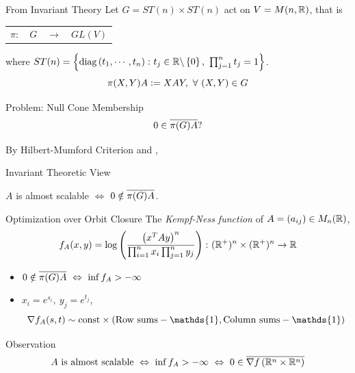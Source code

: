 \documentclass{beamer}
\begin{document}
	\begin{frame}{From Invariant Theory}
		Let $G = ST(n) \times ST(n)$ act on $V = M(n,\mathbb{R})$, that is
		\vspace{-0.5em}
		\begin{center}
			\begin{tabular}{rrcl}
				$\pi \colon$ & $G$ & $\longrightarrow$ & $GL(V)$
			\end{tabular}
		\end{center}
		\vspace{-0.5em}
		where $ST(n) = \left\{\operatorname{diag}\left(t_1,\cdots,t_n\right) \colon t_j \in \mathbb{R} \backslash \left\{0\right\},~\prod_{j=1}^n t_j = 1\right\}$. 
		\begin{equation*}
			\pi(X,Y)A \defeq XAY,~\forall~(X,Y) \in G
			\vspace{-1.5em}
		\end{equation*}
		\begin{block}{Problem: Null Cone Membership}
			\begin{equation*}
				0 \in \clo{\pi(G)A}?
				\vspace{0.5em}
			\end{equation*}
		\end{block}
		\vspace{0.5em}
		By Hilbert-Mumford Criterion \cite{key2,key3} and \cite{key1},
		\begin{block}{Invariant Theoretic View}
			\begin{center}
				$A$ is almost scalable $\Leftrightarrow$ $0 \notin \overline{\pi(G)A}$.
			\end{center}
		\end{block}
	\end{frame}

	\begin{frame}{Optimization over Orbit Closure}
		The \emph{Kempf-Ness function} of $A = (a_{ij}) \in M_n(\mathbb{R})$,
		\begin{equation*}
			f_A(x,y) = \log \left(\frac{\left(x^TAy\right)^n}{\prod_{i=1}^nx_i \prod_{j=1}^ny_j}\right) \colon (\mathbb{R}^+)^{n} \times (\mathbb{R}^+)^{n} \rightarrow \mathbb{R}
		\end{equation*}
		\begin{itemize}
			\item $0 \notin \overline{\pi(G)A}~\Leftrightarrow~\inf f_A > -\infty$
			\item$x_i = e^{s_i},~y_j = e^{t_j}$,
			\vspace{-0.5em}
			\begin{equation*}
				\nabla f_A(s,t)\sim \text{const} \times \bc{\text{Row sums}-\mathds{1},\text{Column sums}-\mathds{1}}
				\vspace{-0.5em}
			\end{equation*}
		\end{itemize}
		\begin{block}{Observation}
			\vspace{-1em}
			\begin{equation*}
				A \text{ is almost scalable} ~\Leftrightarrow~ \inf f_A > -\infty ~\Leftrightarrow~ 0 \in \clo{\nabla f\bc{\R^n \times \R^n}}
				\vspace{0.5em}
			\end{equation*}
		\end{block}
	\end{frame}
\end{document}
